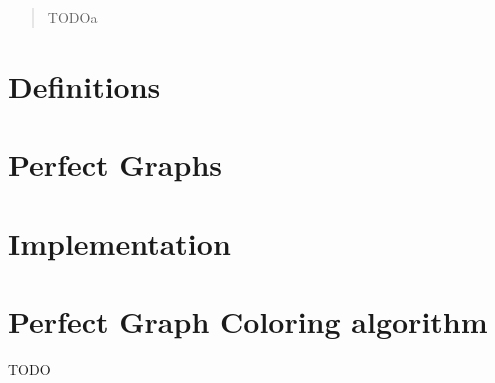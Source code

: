 \documentclass{report}
\author{Adrian Siwiec}
\date{\today{}}
\begin{document}

\pagebreak

\begin{abstract}
	TODOa
\end{abstract}

\listoftheorems[ignoreall,show={defn}]
\tableofcontents

\pagebreak

\chapter*{Definitions}


\chapter{Perfect Graphs}



\chapter{Implementation}


\appendix
\appendixpage
\addappheadtotoc

\chapter{Perfect Graph Coloring algorithm}
TODO


% 
\printbibliography
\end{document}
